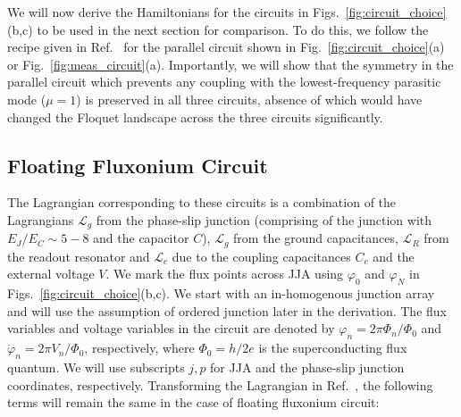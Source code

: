 \documentclass[%
reprint,
superscriptaddress,
 amsmath,amssymb,
 aps,
 prx,
longbibliography,
floatfix,
]{revtex4-2}
\newcommand{\sh}[1]{{\color{blue}{{}[SS: #1]}}}%
\begin{document}
We will now derive the Hamiltonians for the circuits in Figs.~\ref{fig:circuit_choice}(b,c) to be used in the next section for comparison. To do this, we follow the recipe given in Ref.~\cite{viola2015collective} for the parallel circuit shown in Fig.~\ref{fig:circuit_choice}(a) or Fig.~\ref{fig:meas_circuit}(a). Importantly, we will show that the symmetry in the parallel circuit which prevents any coupling with the lowest-frequency parasitic mode ($\mu=1$) is preserved in all three circuits, absence of which would have changed the Floquet landscape across the three circuits significantly. 


\subsection{Floating Fluxonium Circuit}
The Lagrangian corresponding to these circuits is a combination of the Lagrangians $\mathcal{L}_g$ from the phase-slip junction (comprising of the junction with $E_J/E_C\sim 5-8$ and the capacitor $C$), $\mathcal{L}_{g}$ from the ground capacitances, $\mathcal{L}_{R}$ from the readout resonator and $\mathcal{L}_c$ due to the coupling capacitances $C_c$ and the external voltage $V$. We mark the flux points across JJA using $\varphi_0$ and $\varphi_{N}$ in Figs.~\ref{fig:circuit_choice}(b,c). We start with an in-homogenous junction array and will use the assumption of ordered junction later in the derivation. The flux variables and voltage variables in the circuit are denoted by $\varphi_n=2\pi\Phi_n/\Phi_0$ and $\dot{\varphi}_n=2\pi V_n/\Phi_0$, respectively, where $\Phi_0=h/2e$ is the superconducting flux quantum. We will use subscripts $j, p$ for JJA and the phase-slip junction coordinates, respectively. Transforming the Lagrangian in Ref.~\cite{viola2015collective}, the following terms will remain the same in the case of floating fluxonium circuit:
\sh{check for the derivation to include $\hbar =1$ and not h=1}
\end{document}
